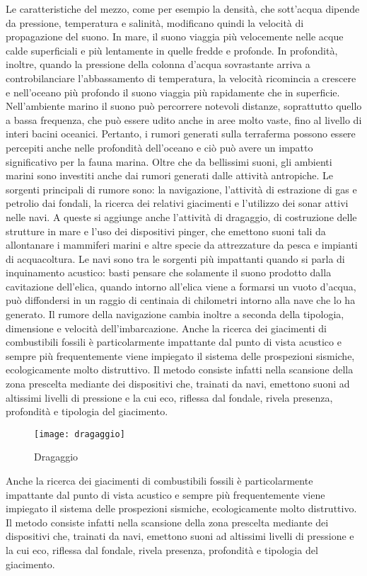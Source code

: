 Le caratteristiche del mezzo, come per esempio la densità, che sott’acqua dipende da pressione, temperatura e salinità, modificano quindi la velocità di propagazione del suono.
In mare, il suono viaggia più velocemente nelle acque calde superficiali e più lentamente in quelle fredde e profonde. 
In profondità, inoltre, quando la pressione della colonna d’acqua sovrastante arriva a controbilanciare l’abbassamento di temperatura, la velocità ricomincia a crescere e nell’oceano più profondo il suono viaggia più rapidamente che in superficie. 
Nell’ambiente marino il suono può percorrere notevoli distanze, soprattutto quello a bassa frequenza, che può essere udito anche in aree molto vaste, fino al livello di interi bacini oceanici. Pertanto, i rumori generati sulla terraferma possono essere percepiti anche nelle profondità dell’oceano e ciò può avere un impatto significativo per la fauna marina.
Oltre che da bellissimi suoni, gli ambienti marini sono investiti anche dai rumori generati dalle attività antropiche. 
Le sorgenti principali di rumore sono: la navigazione, l’attività di estrazione di gas e petrolio dai fondali, la ricerca dei relativi giacimenti e l’utilizzo dei sonar attivi nelle navi. 
A queste si aggiunge anche l’attività di dragaggio, di costruzione delle strutture in mare e l’uso dei dispositivi pinger, che emettono suoni tali da allontanare i mammiferi marini e altre specie da attrezzature da pesca e impianti di acquacoltura.
Le navi sono tra le sorgenti più impattanti quando si parla di inquinamento acustico: 
basti pensare che solamente il suono prodotto dalla cavitazione dell’elica, quando intorno all’elica viene a formarsi un vuoto d’acqua, può diffondersi in un raggio di centinaia di chilometri intorno alla nave che lo ha generato. 
Il rumore della navigazione cambia inoltre a seconda della tipologia, dimensione e velocità dell’imbarcazione.
Anche la ricerca dei giacimenti di combustibili fossili è particolarmente impattante dal punto di vista acustico e sempre più frequentemente viene impiegato il sistema delle prospezioni sismiche, ecologicamente molto distruttivo. 
Il metodo consiste infatti nella scansione della zona prescelta mediante dei dispositivi che, trainati da navi, emettono suoni ad altissimi livelli di pressione e la cui eco, riflessa dal fondale, rivela presenza, profondità e tipologia del giacimento.

\begin{figure}[h]
\centering
\texttt{[image: dragaggio]}
\caption{Dragaggio}
\end{figure}
Anche la ricerca dei giacimenti di combustibili fossili è particolarmente impattante dal punto di vista acustico e sempre più frequentemente viene impiegato il sistema delle prospezioni sismiche, ecologicamente molto distruttivo. 
Il metodo consiste infatti nella scansione della zona prescelta mediante dei dispositivi che, trainati da navi, emettono suoni ad altissimi livelli di pressione e la cui eco, riflessa dal fondale, rivela presenza, profondità e tipologia del giacimento.

